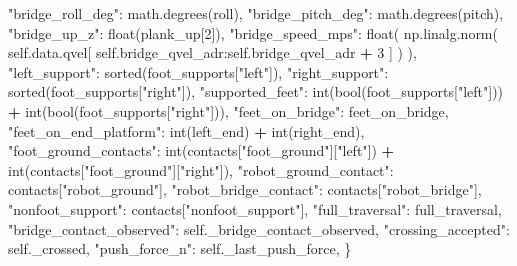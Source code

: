 \documentclass[
  american,
  11pt,
  letterpaper,
]{article}
\newenvironment{Shaded}{\begin{snugshade}}{\end{snugshade}}
\newcommand{\BuiltInTok}[1]{#1}
\newcommand{\DecValTok}[1]{\textcolor[rgb]{0.00,0.00,0.81}{#1}}
\newcommand{\NormalTok}[1]{#1}
\newcommand{\OperatorTok}[1]{\textcolor[rgb]{0.81,0.36,0.00}{\textbf{#1}}}
\newcommand{\StringTok}[1]{\textcolor[rgb]{0.31,0.60,0.02}{#1}}
\newcommand{\VariableTok}[1]{\textcolor[rgb]{0.00,0.00,0.00}{#1}}
\renewenvironment{Shaded}{\par\smallskip}{\par\smallskip}
\begin{document}
\begin{Shaded}
\begin{Highlighting}[]
            \StringTok{"bridge\_roll\_deg"}\NormalTok{: math.degrees(roll),}
            \StringTok{"bridge\_pitch\_deg"}\NormalTok{: math.degrees(pitch),}
            \StringTok{"bridge\_up\_z"}\NormalTok{: }\BuiltInTok{float}\NormalTok{(plank\_up[}\DecValTok{2}\NormalTok{]),}
            \StringTok{"bridge\_speed\_mps"}\NormalTok{: }\BuiltInTok{float}\NormalTok{(}
\NormalTok{                np.linalg.norm(}
                    \VariableTok{self}\NormalTok{.data.qvel[}
                        \VariableTok{self}\NormalTok{.bridge\_qvel\_adr:}\VariableTok{self}\NormalTok{.bridge\_qvel\_adr }\OperatorTok{+} \DecValTok{3}
\NormalTok{                    ]}
\NormalTok{                )}
\NormalTok{            ),}
            \StringTok{"left\_support"}\NormalTok{: }\BuiltInTok{sorted}\NormalTok{(foot\_supports[}\StringTok{"left"}\NormalTok{]),}
            \StringTok{"right\_support"}\NormalTok{: }\BuiltInTok{sorted}\NormalTok{(foot\_supports[}\StringTok{"right"}\NormalTok{]),}
            \StringTok{"supported\_feet"}\NormalTok{: }\BuiltInTok{int}\NormalTok{(}\BuiltInTok{bool}\NormalTok{(foot\_supports[}\StringTok{"left"}\NormalTok{]))}
            \OperatorTok{+} \BuiltInTok{int}\NormalTok{(}\BuiltInTok{bool}\NormalTok{(foot\_supports[}\StringTok{"right"}\NormalTok{])),}
            \StringTok{"feet\_on\_bridge"}\NormalTok{: feet\_on\_bridge,}
            \StringTok{"feet\_on\_end\_platform"}\NormalTok{: }\BuiltInTok{int}\NormalTok{(left\_end) }\OperatorTok{+} \BuiltInTok{int}\NormalTok{(right\_end),}
            \StringTok{"foot\_ground\_contacts"}\NormalTok{: }\BuiltInTok{int}\NormalTok{(contacts[}\StringTok{"foot\_ground"}\NormalTok{][}\StringTok{"left"}\NormalTok{])}
            \OperatorTok{+} \BuiltInTok{int}\NormalTok{(contacts[}\StringTok{"foot\_ground"}\NormalTok{][}\StringTok{"right"}\NormalTok{]),}
            \StringTok{"robot\_ground\_contact"}\NormalTok{: contacts[}\StringTok{"robot\_ground"}\NormalTok{],}
            \StringTok{"robot\_bridge\_contact"}\NormalTok{: contacts[}\StringTok{"robot\_bridge"}\NormalTok{],}
            \StringTok{"nonfoot\_support"}\NormalTok{: contacts[}\StringTok{"nonfoot\_support"}\NormalTok{],}
            \StringTok{"full\_traversal"}\NormalTok{: full\_traversal,}
            \StringTok{"bridge\_contact\_observed"}\NormalTok{: }\VariableTok{self}\NormalTok{.\_bridge\_contact\_observed,}
            \StringTok{"crossing\_accepted"}\NormalTok{: }\VariableTok{self}\NormalTok{.\_crossed,}
            \StringTok{"push\_force\_n"}\NormalTok{: }\VariableTok{self}\NormalTok{.\_last\_push\_force,}
\NormalTok{        \}}


\end{Highlighting}
\end{Shaded}
\end{document}
